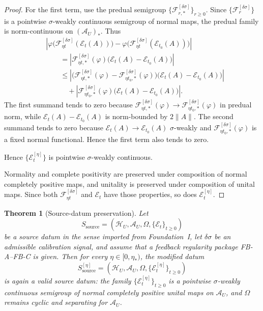 \documentclass[12pt]{article}
\newtheorem{theorem}{Theorem}[section]
\theoremstyle{definition}
\theoremstyle{remark}
\begin{document}
\begin{proof}
For the first term, use the predual semigroup
\(\{\mathscr F_{r,*}^{[\delta\sigma]}\}_{r\ge0}\). Since
\(\{\mathscr F_r^{[\delta\sigma]}\}\) is a pointwise
\(\sigma\)-weakly continuous semigroup of normal maps, the predual
family is norm-continuous on \((\mathcal A_U)_*\). Thus
\begin{align*}
&\left|
\varphi\bigl(\mathscr F_{\eta t}^{[\delta\sigma]}(\mathcal E_t(A))\bigr)
-
\varphi\bigl(\mathscr F_{\eta t}^{[\delta\sigma]}(\mathcal E_{t_0}(A))\bigr)
\right| \\
&\qquad =
\left|
\mathscr F_{\eta t,*}^{[\delta\sigma]}(\varphi)
\bigl(\mathcal E_t(A)-\mathcal E_{t_0}(A)\bigr)
\right| \\
&\qquad \le
\left|
\bigl(\mathscr F_{\eta t,*}^{[\delta\sigma]}(\varphi)
-
\mathscr F_{\eta t_0,*}^{[\delta\sigma]}(\varphi)\bigr)
\bigl(\mathcal E_t(A)-\mathcal E_{t_0}(A)\bigr)
\right| \\
&\qquad\quad +
\left|
\mathscr F_{\eta t_0,*}^{[\delta\sigma]}(\varphi)
\bigl(\mathcal E_t(A)-\mathcal E_{t_0}(A)\bigr)
\right|.
\end{align*}
The first summand tends to zero because
\(\mathscr F_{\eta t,*}^{[\delta\sigma]}(\varphi)\to
\mathscr F_{\eta t_0,*}^{[\delta\sigma]}(\varphi)\) in predual norm,
while \(\mathcal E_t(A)-\mathcal E_{t_0}(A)\) is norm-bounded by
\(2\|A\|\). The second summand tends to zero because
\(\mathcal E_t(A)\to\mathcal E_{t_0}(A)\) \(\sigma\)-weakly and
\(\mathscr F_{\eta t_0,*}^{[\delta\sigma]}(\varphi)\) is a fixed normal
functional. Hence the first term also tends to zero.

Hence \(\{\mathcal E_t^{[\eta]}\}\) is pointwise \(\sigma\)-weakly
continuous.

Normality and complete positivity are preserved under composition of
normal completely positive maps, and unitality is preserved under
composition of unital maps. Since both
\(\mathscr F_{\eta t}^{[\delta\sigma]}\) and \(\mathcal E_t\) have
those properties, so does \(\mathcal E_t^{[\eta]}\).
\end{proof}

\begin{theorem}[Source-datum preservation]\label{thm:preserve}
Let
\[
S_{\mathrm{source}}
=
(\mathcal H_U,\mathcal A_U,\Omega,\{\mathcal E_t\}_{t\ge0})
\]
be a source datum in the sense imported from Foundation~I, let
\(\delta\sigma\) be an admissible calibration signal, and assume that a
feedback regularity package FB-A--FB-C is given. Then for every
\(\eta\in[0,\eta_*)\), the modified datum
\[
S_{\mathrm{source}}^{[\eta]}
=
(\mathcal H_U,\mathcal A_U,\Omega,\{\mathcal E_t^{[\eta]}\}_{t\ge0})
\]
is again a valid source datum: the family
\(\{\mathcal E_t^{[\eta]}\}_{t\ge0}\) is a pointwise
\(\sigma\)-weakly continuous semigroup of normal completely positive
unital maps on \(\mathcal A_U\), and \(\Omega\) remains cyclic and
separating for \(\mathcal A_U\).
\end{theorem}
\end{document}
